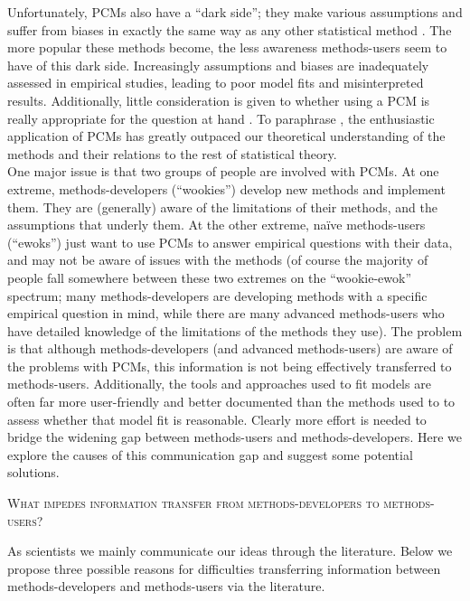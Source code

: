 \documentclass[a4paper,12pt]{article}
\renewcommand{\section}[1]{
  \bigskip
  \begin{center}
  \begin{Large}
  \normalfont\scshape #1
  \medskip
  \end{Large}
  \end{center}
}
\begin{document}
Unfortunately, PCMs also have a ``dark side''; they make various assumptions and suffer from biases in exactly the same way as any other statistical method \citep{freckleton2009seven,boettiger2012your}. 
The more popular these methods become, the less awareness methods-users seem to have of this dark side. Increasingly assumptions and biases are inadequately assessed in empirical studies, leading to poor model fits and misinterpreted results. 
Additionally, little consideration is given to whether using a PCM is really appropriate for the question at hand \citep{losos2011seeing}. 
To paraphrase \citet{blomberg2012independent}, the enthusiastic application of PCMs has greatly outpaced our theoretical understanding of the methods and their relations to the rest of statistical theory.\\


One major issue is that two groups of people are involved with PCMs. 
At one extreme, methods-developers (``wookies'') develop new methods and implement them. They are (generally) aware of the limitations of their methods, and the assumptions that underly them. 
At the other extreme, na\"{i}ve methods-users (``ewoks'') just want to use PCMs to answer empirical questions with their data, and may not be aware of issues with the methods (of course the majority of people fall somewhere between these two extremes on the ``wookie-ewok'' spectrum; many methods-developers are developing methods with a specific empirical question in mind, while there are many advanced methods-users who have detailed knowledge of the limitations of the methods they use). 
The problem is that although methods-developers (and advanced methods-users) are aware of the problems with PCMs, this information is not being effectively transferred to methods-users. 
Additionally, the tools and approaches used to fit models are often far more user-friendly and better documented than the methods used to to assess whether that model fit is reasonable. 
Clearly more effort is needed to bridge the widening gap between methods-users and methods-developers. Here we explore the causes of this communication gap and suggest some potential solutions. %

\section{What impedes information transfer from methods-developers to methods-users?}
As scientists we mainly communicate our ideas through the literature. 
Below we propose three possible reasons for difficulties transferring information between methods-developers and methods-users via the literature.
\end{document}
